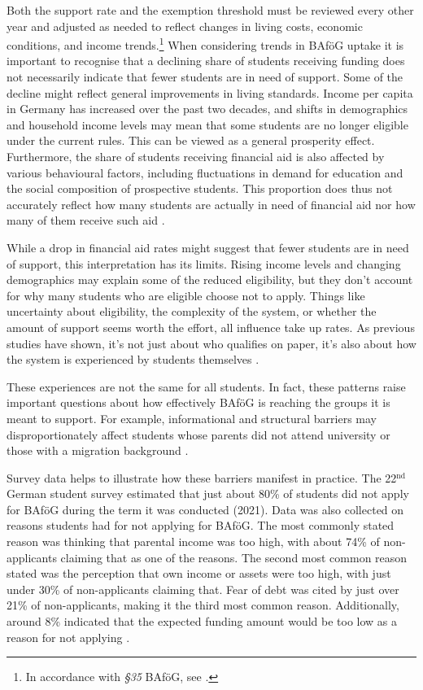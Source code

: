 Both the support rate and the exemption threshold must be reviewed every other year and adjusted as needed to reflect changes in living costs, economic conditions, and income trends.\footnote{
    In accordance with \textit{§35} BAföG, see \cite{bafoeg_law}.
}
When considering trends in BAföG uptake it is important to recognise that a declining share of students receiving funding does not necessarily indicate that fewer students are in need of support. 
Some of the decline might reflect general improvements in living standards. 
Income per capita in Germany has increased over the past two decades, and shifts in demographics and household income levels may mean that some students are no longer eligible under the current rules. 
This can be viewed as a general prosperity effect. 
Furthermore, the share of students receiving financial aid is also affected by various behavioural factors, including fluctuations in demand for education and the social composition of prospective students. 
This proportion does thus not accurately reflect how many students are actually in need of financial aid nor how many of them receive such aid \citep{meier_bafog_2024, meier_zur_2024}.

While a drop in financial aid rates might suggest that fewer students are in need of support, this interpretation has its limits. 
Rising income levels and changing demographics may explain some of the reduced eligibility, but they don't account for why many students who are eligible choose not to apply. 
Things like uncertainty about eligibility, the complexity of the system, or whether the amount of support seems worth the effort, all influence take up rates. 
As previous studies have shown, it’s not just about who qualifies on paper, it’s also about how the system is experienced by students themselves \citep{meier_bafog_2024, meier_zur_2024}.

These experiences are not the same for all students. In fact, these patterns raise important questions about how effectively BAföG is reaching the groups it is meant to support. For example, informational and structural barriers may disproportionately affect students whose parents did not attend university or those with a migration background \citep{kroher_studierendenbefragung_2023}.

Survey data helps to illustrate how these barriers manifest in practice. 
The 22\( ^\text{nd} \) German student survey estimated that just about 80\% of students did not apply for BAföG during the term it was conducted (2021). 
Data was also collected on reasons students had for not applying for BAföG. 
The most commonly stated reason was thinking that parental income was too high, with about 74\% of non-applicants claiming that as one of the reasons. 
The second most common reason stated was the perception that own income or assets were too high, with just under 30\% of non-applicants claiming that. 
Fear of debt was cited by just over 21\% of non-applicants, making it the third most common reason. 
Additionally, around 8\% indicated that the expected funding amount would be too low as a reason for not applying \citep{kroher_studierendenbefragung_2023}.


